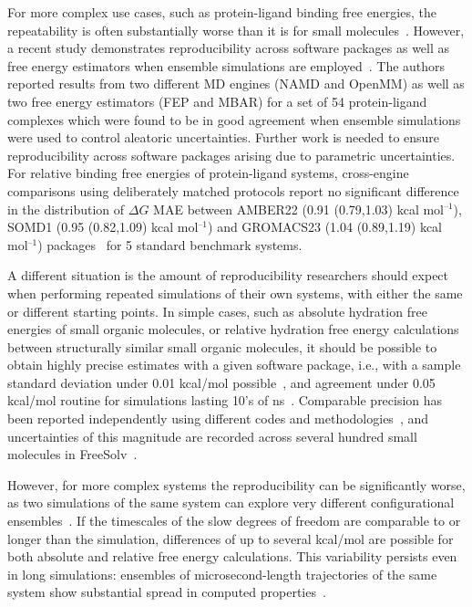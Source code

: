 \documentclass[9pt,bestpractices]{livecoms}
\begin{document}
For more complex use cases, such as protein-ligand binding free energies, the repeatability is often substantially worse than it is for small molecules~\cite{rizzi2019sampl6, wade2022}. 
However, a recent study demonstrates reproducibility across software packages as well as free energy estimators when ensemble simulations are employed~\cite{wade2022}. The authors reported results from two different MD engines (NAMD and OpenMM) as well as two free energy estimators (FEP and MBAR) for a set of 54 protein-ligand complexes which were found to be in good agreement when ensemble simulations were used to control aleatoric uncertainties. Further work is needed to ensure reproducibility across software packages arising due to parametric uncertainties. 
For relative binding free energies of protein-ligand systems, cross-engine
comparisons using deliberately matched protocols report no significant difference in the distribution of $\Delta G$ MAE between AMBER22 (0.91 (0.79,1.03) kcal mol$^{–1}$), SOMD1 (0.95 (0.82,1.09) kcal mol$^{–1}$) and GROMACS23 (1.04 (0.89,1.19) kcal mol$^{–1}$) packages~\cite{herz2025modular} for 5 standard benchmark systems.

A different situation is the amount of reproducibility researchers should expect when performing repeated simulations of their own systems, with either the same or different starting points. In simple cases, such as absolute hydration free energies of small organic molecules, or relative hydration free energy calculations between structurally similar small organic molecules, it should be possible to obtain highly precise estimates with a given software package, i.e., with a sample standard deviation under 0.01 kcal/mol possible~\cite{rizzi2019sampl6}, and agreement under 0.05 kcal/mol routine for simulations lasting 10's of ns~\cite{paliwal2011benchmark}. Comparable precision has been reported independently using different codes and methodologies~\cite{karwounopoulos2023calculations,
procacci2019accuracy}, and uncertainties of this magnitude are recorded across
several hundred small molecules in FreeSolv~\cite{mobley2014freesolv}. 

However, for more complex systems the reproducibility can be significantly
worse, as two simulations of the same system can explore very different
configurational ensembles~\cite{bhati2018, bhati2019, wan2021uq, vassaux2021}.
If the timescales of the slow degrees of freedom are comparable to or longer
than the simulation, differences of up to several kcal/mol are possible for
both absolute and relative free energy calculations. This variability persists
even in long simulations: ensembles of microsecond-length trajectories of the
same system show substantial spread in computed properties~\cite{bhati2023}.
\end{document}
